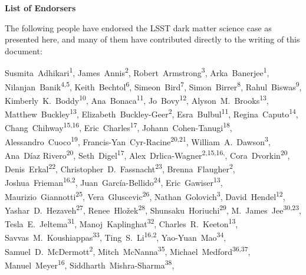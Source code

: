 
\begin{center}
  {\Large \bf List of Endorsers}
\end{center}
\bigskip

The following people have endorsed the LSST dark matter science case as presented here, and many of them have contributed directly to the writing of this document:

\def\altaffilmark#1{\textsuperscript{#1}}
\def\affil#1{\noindent #1 \\}

\normalsize
\begin{raggedright}

Susmita~Adhikari\altaffilmark{1},
James~Annis\altaffilmark{2},
Robert~Armstrong\altaffilmark{3},
Arka~Banerjee\altaffilmark{1},
Nilanjan~Banik\altaffilmark{4,5},
Keith~Bechtol\altaffilmark{6},
Simeon~Bird\altaffilmark{7},
Simon~Birrer\altaffilmark{8},
Rahul~Biswas\altaffilmark{9},
Kimberly~K.~Boddy\altaffilmark{10},
Ana~Bonaca\altaffilmark{11},
Jo~Bovy\altaffilmark{12},
Alyson~M.~Brooks\altaffilmark{13},
Matthew~Buckley\altaffilmark{13},
Elizabeth~Buckley-Geer\altaffilmark{2},
Esra~Bulbul\altaffilmark{11},
Regina~Caputo\altaffilmark{14},
Chang~Chihway\altaffilmark{15,16},
Eric~Charles\altaffilmark{17},
Johann~Cohen-Tanugi\altaffilmark{18},
Alessandro~Cuoco\altaffilmark{19},
Francis-Yan~Cyr-Racine\altaffilmark{20,21},
William~A.~Dawson\altaffilmark{3},
Ana~D\'{i}az Rivero\altaffilmark{20},
Seth~Digel\altaffilmark{17},
Alex~Drlica-Wagner\altaffilmark{2,15,16,\textdagger},
Cora~Dvorkin\altaffilmark{20},
Denis~Erkal\altaffilmark{22},
Christopher~D.~Fassnacht\altaffilmark{23},
Brenna~Flaugher\altaffilmark{2},
Joshua~Frieman\altaffilmark{16,2},
Juan~Garc\'ia-Bellido\altaffilmark{24},
Eric~Gawiser\altaffilmark{13},
Maurizio~Giannotti\altaffilmark{25},
Vera~Gluscevic\altaffilmark{26},
Nathan~Golovich\altaffilmark{3},
David~Hendel\altaffilmark{12},
Yashar~D.~Hezaveh\altaffilmark{27},
Renee~Hlo\v{z}ek\altaffilmark{28},
Shunsaku~Horiuchi\altaffilmark{29},
M.~James~Jee\altaffilmark{30,23},
Tesla~E.~Jeltema\altaffilmark{31},
Manoj~Kaplinghat\altaffilmark{32},
Charles~R.~Keeton\altaffilmark{13},
Savvas~M.~Koushiappas\altaffilmark{33},
Ting~S.~Li\altaffilmark{16,2},
Yao-Yuan~Mao\altaffilmark{34},
Samuel~D.~McDermott\altaffilmark{2},
Mitch~McNanna\altaffilmark{35},
Michael~Medford\altaffilmark{36,37},
Manuel~Meyer\altaffilmark{16},
Siddharth~Mishra-Sharma\altaffilmark{38},

\end{raggedright}
